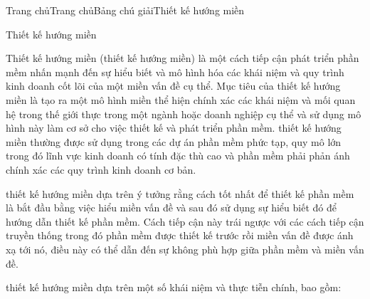 






Trang chủTrang chủBảng chú giảiThiết kế hướng miền

Thiết kế hướng miền

Thiết kế hướng miền (thiết kế hướng miền) là một cách tiếp cận phát triển phần mềm nhấn mạnh đến sự hiểu biết và mô hình hóa các khái niệm và quy trình kinh doanh cốt lõi của một miền vấn đề cụ thể. Mục tiêu của thiết kế hướng miền là tạo ra một mô hình miền thể hiện chính xác các khái niệm và mối quan hệ trong thế giới thực trong một ngành hoặc doanh nghiệp cụ thể và sử dụng mô hình này làm cơ sở cho việc thiết kế và phát triển phần mềm. thiết kế hướng miền thường được sử dụng trong các dự án phần mềm phức tạp, quy mô lớn trong đó lĩnh vực kinh doanh có tính đặc thù cao và phần mềm phải phản ánh chính xác các quy trình kinh doanh cơ bản.

thiết kế hướng miền dựa trên ý tưởng rằng cách tốt nhất để thiết kế phần mềm là bắt đầu bằng việc hiểu miền vấn đề và sau đó sử dụng sự hiểu biết đó để hướng dẫn thiết kế phần mềm. Cách tiếp cận này trái ngược với các cách tiếp cận truyền thống trong đó phần mềm được thiết kế trước rồi miền vấn đề được ánh xạ tới nó, điều này có thể dẫn đến sự không phù hợp giữa phần mềm và miền vấn đề.

thiết kế hướng miền dựa trên một số khái niệm và thực tiễn chính, bao gồm:

